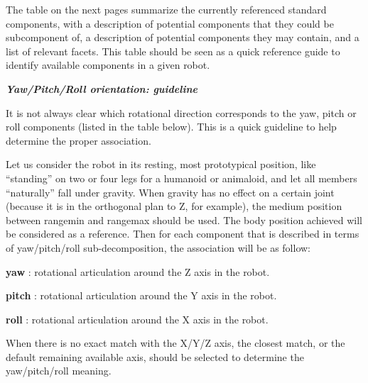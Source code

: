 \documentclass[a4paper]{article}
\begin{document}
{\sffamily
The table on the next pages summarize the currently referenced standard
components, with a description of potential components that they could
be subcomponent of, a description of potential components they may
contain, and a list of relevant facets. This table should be seen as a
quick reference guide to identify available components in a given
robot.}

{\sffamily\bfseries\itshape
Yaw/Pitch/Roll orientation: guideline}

{\sffamily
It is not always clear which rotational direction corresponds to the
yaw, pitch or roll components (listed in the table below). This is a
quick guideline to help determine the proper association. }

{\sffamily
Let us consider the robot in its resting, most prototypical position,
like “standing” on two or four legs for a humanoid or animaloid, and
let all members “naturally” fall under gravity. When gravity has no
effect on a certain joint (because it is in the orthogonal plan to Z,
for example), the medium position between rangemin and rangemax should
be used. The body position achieved will be considered as a reference.
Then for each component that is described in terms of yaw/pitch/roll
sub-decomposition, the association will be as follow:}

{
\foreignlanguage{english}{\textsf{\textbf{
yaw}}}\foreignlanguage{english}{\textsf{ : rotational articulation
around the Z axis in the robot.}}}

{\sffamily
\textbf{ pitch} : rotational articulation around the Y axis in the
robot.}

{\sffamily
\textbf{ roll} : rotational articulation around the X axis in the
robot.}

{\sffamily
When there is no exact match with the X/Y/Z axis, the closest match, or
the default remaining available axis, should be selected to determine
the yaw/pitch/roll meaning. }
\end{document}
